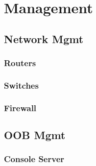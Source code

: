 \chapter{Management}

\section{Network Mgmt}

\subsection{Routers}

\subsection{Switches}

\subsection{Firewall}

\section{OOB Mgmt}

\subsection{Console Server}

